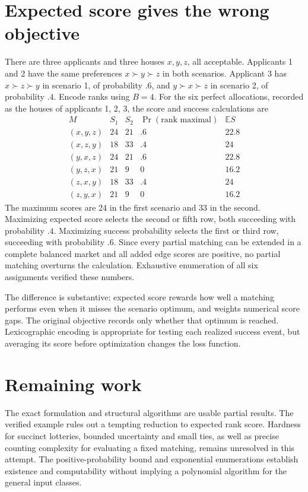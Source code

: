 \documentclass[11pt]{article}
\newcommand{\E}{\mathbb E}
\begin{document}
\section*{Expected score gives the wrong objective}
There are three applicants and three houses $x,y,z$, all acceptable. Applicants 1 and 2 have the same preferences $x\succ y\succ z$ in both scenarios. Applicant 3 has $x\succ z\succ y$ in scenario 1, of probability $.6$, and $y\succ x\succ z$ in scenario 2, of probability $.4$. Encode ranks using $B=4$. For the six perfect allocations, recorded as the houses of applicants 1, 2, 3, the score and success calculations are
\[
\begin{array}{c|rr|r|r}
M&S_1&S_2&\Pr(\text{rank maximal})&\E S\\\hline
(x,y,z)&24&21&.6&22.8\\
(x,z,y)&18&33&.4&24\\
(y,x,z)&24&21&.6&22.8\\
(y,z,x)&21&9&0&16.2\\
(z,x,y)&18&33&.4&24\\
(z,y,x)&21&9&0&16.2
\end{array}
\]
The maximum scores are 24 in the first scenario and 33 in the second. Maximizing expected score selects the second or fifth row, both succeeding with probability $.4$. Maximizing success probability selects the first or third row, succeeding with probability $.6$. Since every partial matching can be extended in a complete balanced market and all added edge scores are positive, no partial matching overturns the calculation. Exhaustive enumeration of all six assignments verified these numbers.

The difference is substantive: expected score rewards how well a matching performs even when it misses the scenario optimum, and weights numerical score gaps. The original objective records only whether that optimum is reached. Lexicographic encoding is appropriate for testing each realized success event, but averaging its score before optimization changes the loss function.

\section*{Remaining work}
The exact formulation and structural algorithms are usable partial results. The verified example rules out a tempting reduction to expected rank score. Hardness for succinct lotteries, bounded uncertainty and small ties, as well as precise counting complexity for evaluating a fixed matching, remains unresolved in this attempt. The positive-probability bound and exponential enumerations establish existence and computability without implying a polynomial algorithm for the general input classes.
\end{document}
